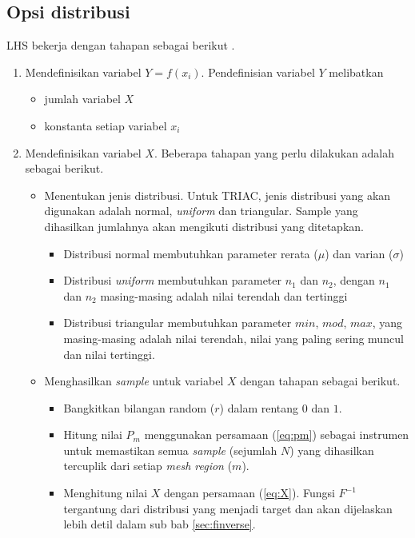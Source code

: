 \documentclass[a4paper,11pt]{report}
\begin{document}
\subsection{Opsi distribusi}
LHS bekerja dengan tahapan sebagai berikut \cite{mbasinta}.
\begin{enumerate}
  \item Mendefinisikan variabel $Y=f(x_i)$. Pendefinisian variabel $Y$ melibatkan
  \begin{itemize}
    \item jumlah variabel $X$
    \item konstanta setiap variabel $x_i$
  \end{itemize}
  \item Mendefinisikan variabel $X$. Beberapa tahapan yang perlu dilakukan adalah sebagai berikut.
  \begin{itemize}
    \item Menentukan jenis distribusi. Untuk TRIAC, jenis distribusi yang akan digunakan adalah normal, \textit{uniform} dan triangular. Sample yang dihasilkan jumlahnya akan mengikuti distribusi yang ditetapkan.
    \begin{itemize}
      \item Distribusi normal membutuhkan parameter rerata ($\mu$) dan varian ($\sigma$)
      \item Distribusi \textit{uniform} membutuhkan parameter $n_1$ dan $n_2$, dengan $n_1$ dan $n_2$ masing-masing adalah nilai terendah dan tertinggi
      \item Distribusi triangular membutuhkan parameter $min$, $mod$, $max$, yang masing-masing adalah nilai terendah, nilai yang paling sering muncul dan nilai tertinggi.
    \end{itemize}
    \item Menghasilkan \textit{sample} untuk variabel $X$ dengan tahapan sebagai berikut.
    \begin{itemize}
       \item Bangkitkan bilangan random ($r$) dalam rentang $0$ dan $1$.
       \item Hitung nilai $P_m$ menggunakan persamaan (\ref{eq:pm}) sebagai instrumen untuk memastikan semua \textit{sample} (sejumlah $N$) yang dihasilkan tercuplik dari setiap \textit{mesh region} ($m$). 
       \item Menghitung nilai $X$ dengan persamaan (\ref{eq:X}). Fungsi $F^{-1}$ tergantung dari distribusi yang menjadi target dan akan dijelaskan lebih detil dalam sub bab \ref{sec:finverse}. 
     \end{itemize} 
     

\end{itemize}
\end{enumerate}
\end{document}
